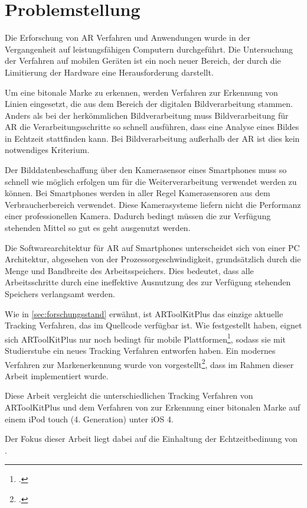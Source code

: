 \section{Problemstellung} %
\label{sec:problemstellung}
\begin{comment}
	Problemstellung: Problemstellung und Frage im Detail erläutern
\end{comment}

Die Erforschung von \gls{AR} Verfahren und Anwendungen wurde in der Vergangenheit auf leistungsfähigen Computern
 durchgeführt. Die Untersuchung der Verfahren auf mobilen Geräten ist ein noch neuer Bereich, der durch die Limitierung
 der Hardware eine Herausforderung darstellt.

Um eine bitonale Marke zu erkennen, werden Verfahren zur Erkennung von Linien eingesetzt, die aus dem Bereich der
 digitalen Bildverarbeitung stammen. Anders als bei der herkömmlichen Bildverarbeitung muss Bildverarbeitung für
 \gls{AR} die Verarbeitungsschritte so schnell ausführen, dass eine Analyse eines Bildes in Echtzeit stattfinden kann.
 Bei Bildverarbeitung außerhalb der \gls{AR} ist dies kein notwendiges Kriterium.

Der Bilddatenbeschaffung über den Kamerasensor eines Smartphones muss so schnell wie möglich erfolgen um für die
 Weiterverarbeitung verwendet werden zu können. Bei Smartphones werden in aller Regel Kamerasensoren aus dem
 Verbraucherbereich verwendet. Diese Kamerasysteme liefern nicht die Performanz einer professionellen Kamera. Dadurch
 bedingt müssen die zur Verfügung stehenden Mittel so gut es geht ausgenutzt werden.

Die Softwarearchitektur für \gls{AR} auf Smartphones unterscheidet sich von einer PC Architektur, abgesehen von der
 Prozessorgeschwindigkeit, grundsätzlich durch die Menge und Bandbreite des Arbeitsspeichers. Dies bedeutet, dass alle
 Arbeitsschritte durch eine ineffektive Ausnutzung des zur Verfügung stehenden Speichers verlangsamt werden.

Wie in \autoref{sec:forschungsstand} erwähnt, ist ARToolKitPlus das einzige aktuelle Tracking Verfahren, das im
 Quellcode verfügbar ist. Wie \citeauthor{wagner09a} festgestellt haben, eignet sich ARToolKitPlus nur noch bedingt für
 mobile Plattformen\footcite{wagner09a}, sodass sie mit Studierstube ein neues Tracking Verfahren entworfen haben. Ein
 modernes Verfahren zur Markenerkennung wurde von \citeauthor{hirzer08} vorgestellt\footcite{hirzer08}, dass im Rahmen
 dieser Arbeit implementiert wurde.

Diese Arbeit vergleicht die unterschiedlichen Tracking Verfahren von ARToolKitPlus und dem Verfahren von
 \citeauthor{hirzer08} zur Erkennung einer bitonalen Marke auf einem iPod touch (4. Generation) unter iOS 4.

Der Fokus dieser Arbeit liegt dabei auf die Einhaltung der Echtzeitbedinung von \citeauthor{azuma97}.


